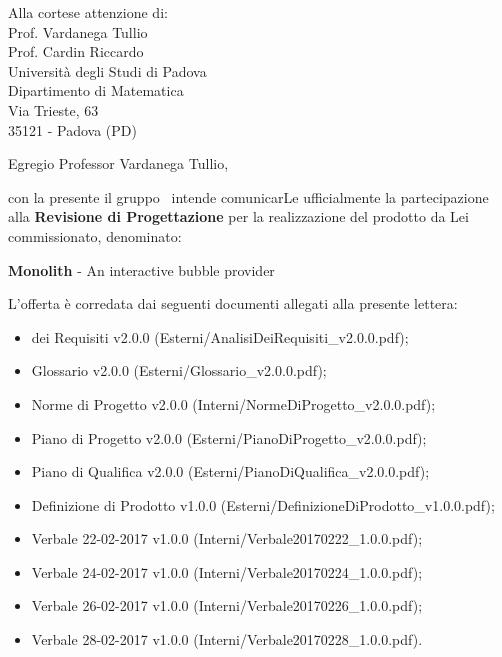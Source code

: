 

\newcommand{\logo}{../../Template/Logo/Logo.png}
\newcommand{\data}{\today}
\newcommand{\oggetto}{Partecipazione alla Revisione di Progettazione.}
\newcommand{\mittente}{Francesco Bazzerla \\ Responsabile NPE Developers}
\newcommand{\firma}{../../Template/Firme/FB.png}





\begin{letter}{Alla cortese attenzione di:  \\
 Prof. Vardanega Tullio \\
 Prof. Cardin Riccardo \\
 Università degli Studi di Padova \\
 Dipartimento di Matematica \\
 Via Trieste, 63 \\
 35121 - Padova (PD)}

\opening{Egregio Professor Vardanega Tullio,} 

con la presente il gruppo \gruppo\ intende comunicarLe ufficialmente la partecipazione alla \textbf{Revisione di Progettazione} per la realizzazione del prodotto da Lei commissionato, denominato:
\begin{center}
\textbf{Monolith} - An interactive bubble provider
\end{center}
L'offerta è corredata dai seguenti documenti allegati alla presente lettera:
\begin{itemize}
	\item {} dei Requisiti v2.0.0 (Esterni/AnalisiDeiRequisiti\_v2.0.0.pdf);
	\item Glossario v2.0.0 (Esterni/Glossario\_v2.0.0.pdf);
	\item Norme di Progetto v2.0.0 (Interni/NormeDiProgetto\_v2.0.0.pdf);
	\item Piano di Progetto v2.0.0 (Esterni/PianoDiProgetto\_v2.0.0.pdf);
	\item Piano di Qualifica v2.0.0 (Esterni/PianoDiQualifica\_v2.0.0.pdf);
	\item Definizione di Prodotto v1.0.0 (Esterni/DefinizioneDiProdotto\_v1.0.0.pdf);
	\item Verbale 22-02-2017 v1.0.0 (Interni/Verbale20170222\_1.0.0.pdf);
	\item Verbale 24-02-2017 v1.0.0 (Interni/Verbale20170224\_1.0.0.pdf);
	\item Verbale 26-02-2017 v1.0.0 (Interni/Verbale20170226\_1.0.0.pdf);
	\item Verbale 28-02-2017 v1.0.0 (Interni/Verbale20170228\_1.0.0.pdf).
\end{itemize}


\end{letter}
